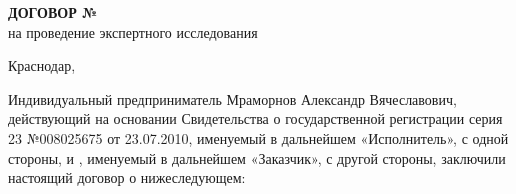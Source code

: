 \documentclass[a4paper,12pt,english,notitlepage]{report}
\begin{document}
	\def\цена{70000}
	\pagestyle{plain}
	
	
	
	\pagestyle{fancy}
	\frenchspacing 
	\fancyhf{}
	\fancyhead{}
	\fancyfoot{} 
	\fancyhead[RE]{ } %
	\fancyhead{}
	\fancyhead[RE]{\small \NomerDoc} %
	
	\fancyfoot[R]{\textcolor{black}{ \textit{{\small }} \rule{3cm}{0.1 mm}}}
	
	\fancyfoot[CE]{\thepage}%
	\fancyfoot[CO]{\thepage}
	
	
	\renewcommand{\headrulewidth}{0 mm}%
	\renewcommand{\headrule}{\hbox to\headwidth{%
			\color{red}\leaders\hrule height \headrulewidth\hfill}}
	
	\renewcommand{\footrulewidth}{0 mm}%
	\futurelet\TMPfootrule\def\footrule{{\color{black}\TMPfootrule}}
	\thispagestyle{empty}  %
	
	

\begin{center}
    	\textbf{{\large  ДОГОВОР № \NomerDoc}}\\
    	 на проведение экспертного исследования
    	 \vspace{-6mm}
    \end{center}
\vspace{-6mm}
\begin{flushright}
		\hfill	Краснодар, \dog    \\[8mm]
\end{flushright} 
\vspace{-6mm}
Индивидуальный предприниматель Мраморнов Александр Вячеславович, действующий на основании Свидетельства о государственной регистрации серия 23 №008025675 от 23.07.2010, именуемый в дальнейшем «Исполнитель», с одной стороны, и , %
 именуемый в дальнейшем «Заказчик», с другой стороны, заключили настоящий договор о нижеследующем:
\end{document}
